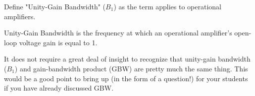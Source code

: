 

Define "Unity-Gain Bandwidth" ($B_1$) as the term applies to operational amplifiers.







Unity-Gain Bandwidth is the frequency at which an operational amplifier's open-loop voltage gain is equal to 1.







It does not require a great deal of insight to recognize that unity-gain bandwidth ($B_1$) and gain-bandwidth product (GBW) are pretty much the same thing.  This would be a good point to bring up (in the form of a question!) for your students if you have already discussed GBW.




